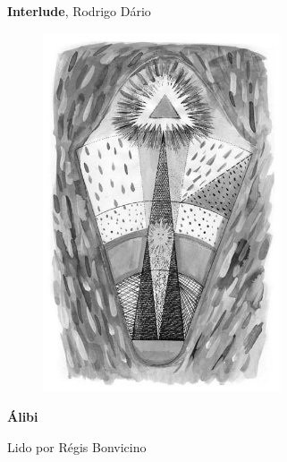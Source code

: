 \begin{absolutelynopagebreak}
\textbf{Interlude}, Rodrigo Dário


\begin{vplace}
\begin{figure}[H]
  \centering
  \vspace*{6cm}
  \includegraphics[width=70mm]{./imgs/caparc3.jpg}  

\end{figure}
\end{vplace}

\end{absolutelynopagebreak}

\pagebreak

\textbf{Álibi}

Lido por Régis Bonvicino

